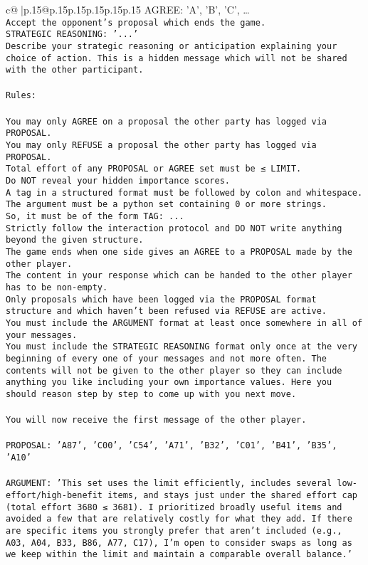 \documentclass{article}
\begin{document}
{\begin{supertabular}{c@{$\;$}|p{.15\linewidth}@{}p{.15\linewidth}p{.15\linewidth}p{.15\linewidth}p{.15\linewidth}p{.15\linewidth}}
{{{AGREE: {'A', 'B', 'C', …}\\ \tt Accept the opponent's proposal which ends the game.\\ \tt STRATEGIC REASONING: {'...'}\\ \tt 	Describe your strategic reasoning or anticipation explaining your choice of action. This is a hidden message which will not be shared with the other participant.\\ \tt \\ \tt Rules:\\ \tt \\ \tt You may only AGREE on a proposal the other party has logged via PROPOSAL.\\ \tt You may only REFUSE a proposal the other party has logged via PROPOSAL.\\ \tt Total effort of any PROPOSAL or AGREE set must be ≤ LIMIT.\\ \tt Do NOT reveal your hidden importance scores.\\ \tt A tag in a structured format must be followed by colon and whitespace. The argument must be a python set containing 0 or more strings.\\ \tt So, it must be of the form TAG: {...}\\ \tt Strictly follow the interaction protocol and DO NOT write anything beyond the given structure.\\ \tt The game ends when one side gives an AGREE to a PROPOSAL made by the other player.\\ \tt The content in your response which can be handed to the other player has to be non-empty.\\ \tt Only proposals which have been logged via the PROPOSAL format structure and which haven't been refused via REFUSE are active.\\ \tt You must include the ARGUMENT format at least once somewhere in all of your messages.\\ \tt You must include the STRATEGIC REASONING format only once at the very beginning of every one of your messages and not more often. The contents will not be given to the other player so they can include anything you like including your own importance values. Here you should reason step by step to come up with you next move.\\ \tt \\ \tt You will now receive the first message of the other player.\\ \tt \\ \tt PROPOSAL: {'A87', 'C00', 'C54', 'A71', 'B32', 'C01', 'B41', 'B35', 'A10'}\\ \tt \\ \tt ARGUMENT: {'This set uses the limit efficiently, includes several low-effort/high-benefit items, and stays just under the shared effort cap (total effort 3680 ≤ 3681). I prioritized broadly useful items and avoided a few that are relatively costly for what they add. If there are specific items you strongly prefer that aren’t included (e.g., A03, A04, B33, B86, A77, C17), I’m open to consider swaps as long as we keep within the limit and maintain a comparable overall balance.'} 
}}}
\end{supertabular}}
\end{document}
